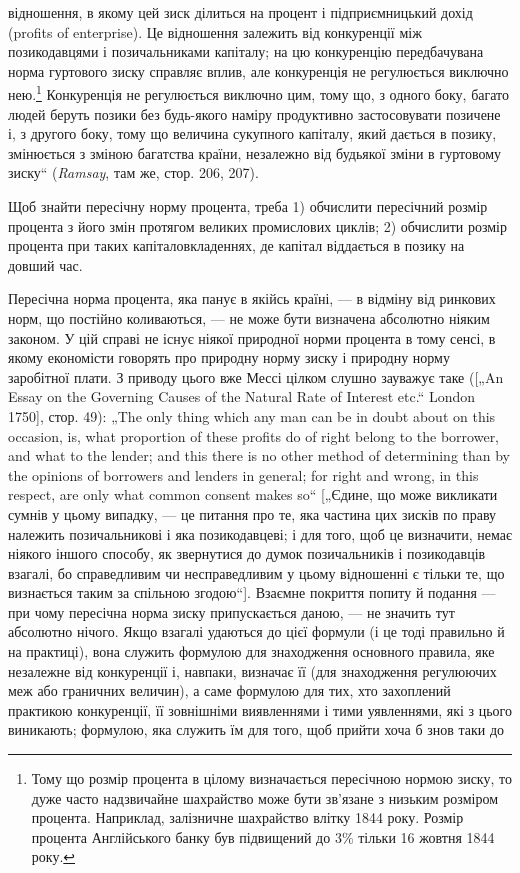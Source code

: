 \parcont{}  %
відношення, в якому цей зиск ділиться на процент і підприємницький
дохід (profits of enterprise). Це відношення залежить
від конкуренції між позикодавцями і позичальниками капіталу;
на цю конкуренцію передбачувана норма гуртового зиску
справляє вплив, але конкуренція не регулюється виключно нею.\footnote{
Тому що розмір процента в цілому визначається пересічною нормою
зиску, то дуже часто надзвичайне шахрайство може бути зв’язане з низьким
розміром процента. Наприклад, залізничне шахрайство влітку 1844 року. Розмір
процента Англійського банку був підвищений до 3\% тільки 16 жовтня
1844 року.
}
Конкуренція не регулюється виключно цим, тому що, з одного
боку, багато людей беруть позики без будь-якого наміру продуктивно
застосовувати позичене і, з другого боку, тому що величина
сукупного капіталу, який дається в позику, змінюється з зміною
багатства країни, незалежно від будьякої зміни в гуртовому
зиску“ (\emph{Ramsay}, там же, стор. 206, 207).

Щоб знайти пересічну норму процента, треба 1) обчислити
пересічний розмір процента з його змін протягом великих промислових
циклів; 2) обчислити розмір процента при таких капіталовкладеннях,
де капітал віддається в позику на довший час.

Пересічна норма процента, яка панує в якійсь країні, — в відміну
від ринкових норм, що постійно коливаються, — не може бути
визначена абсолютно ніяким законом. У цій справі не існує ніякої
природної норми процента в тому сенсі, в якому економісти
говорять про природну норму зиску і природну норму заробітної
плати. З приводу цього вже Мессі цілком слушно зауважує
таке ([„An Essay on the Governing Causes of the Natural Rate of Interest
etc.“ London 1750], стор. 49): „The only thing which any man can
be in doubt about on this occasion, is, what proportion of these profits
do of right belong to the borrower, and what to the lender; and this there
is no other method of determining than by the opinions of borrowers
and lenders in general; for right and wrong, in this respect, are
only what common consent makes so“ [„Єдине, що може викликати
сумнів у цьому випадку, — це питання про те, яка частина цих
зисків по праву належить позичальникові і яка позикодавцеві;
і для того, щоб це визначити, немає ніякого іншого способу, як
звернутися до думок позичальників і позикодавців взагалі, бо
справедливим чи несправедливим у цьому відношенні є тільки те,
що визнається таким за спільною згодою“]. Взаємне покриття
попиту й подання — при чому пересічна норма зиску припускається
даною, — не значить тут абсолютно нічого. Якщо взагалі
удаються до цієї формули (і це тоді правильно й на практиці),
вона служить формулою для знаходження основного правила,
яке незалежне від конкуренції і, навпаки, визначає її (для знаходження
регулюючих меж або граничних величин), а саме формулою
для тих, хто захоплений практикою конкуренції, її зовнішніми
виявленнями і тими уявленнями, які з цього виникають; формулою,
яка служить їм для того, щоб прийти хоча б знов таки до
\parbreak{}  %

